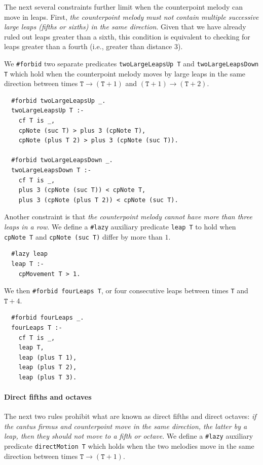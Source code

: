 The next several constraints further limit when the counterpoint melody can move in leaps. First, \emph{the counterpoint melody must not contain multiple successive large leaps (fifths or sixths) in the same direction}. Given that we have already ruled out leaps greater than a sixth, this condition is equivalent to checking for leaps greater than a fourth (i.e., greater than distance $3$).

We \verb|#forbid| two separate predicates \verb|twoLargeLeapsUp T| and \verb|twoLargeLeapsDown T| which hold when the counterpoint melody moves by large leaps in the same direction between times $\mathtt{T}\to(\mathtt{T}+1)$ and $(\mathtt{T}+1)\to(\mathtt{T}+2)$.

\begin{verbatim}
  #forbid twoLargeLeapsUp _.
  twoLargeLeapsUp T :-
    cf T is _,
    cpNote (suc T) > plus 3 (cpNote T),
    cpNote (plus T 2) > plus 3 (cpNote (suc T)).

  #forbid twoLargeLeapsDown _.
  twoLargeLeapsDown T :-
    cf T is _,
    plus 3 (cpNote (suc T)) < cpNote T,
    plus 3 (cpNote (plus T 2)) < cpNote (suc T).
\end{verbatim}

Another constraint is that \emph{the counterpoint melody cannot have more than three leaps in a row}. We define a \verb|#lazy| auxiliary predicate \verb|leap T| to hold when \verb|cpNote T| and \verb|cpNote (suc T)| differ by more than $1$.

\begin{verbatim}
  #lazy leap
  leap T :-
    cpMovement T > 1.
\end{verbatim}

We then \verb|#forbid fourLeaps T|, or four consecutive leaps between times \verb|T| and $\mathtt{T}+4$.

\begin{verbatim}
  #forbid fourLeaps _.
  fourLeaps T :-
    cf T is _,
    leap T,
    leap (plus T 1),
    leap (plus T 2),
    leap (plus T 3).
\end{verbatim}



\paragraph{Direct fifths and octaves}

The next two rules prohibit what are known as direct fifths and direct octaves: \emph{if the cantus firmus and counterpoint move in the same direction, the latter by a leap, then they should not move to a fifth or octave}. We define a \verb|#lazy| auxiliary predicate \verb|directMotion T| which holds when the two melodies move in the same direction between times $\mathtt{T}\to(\mathtt{T}+1)$.

